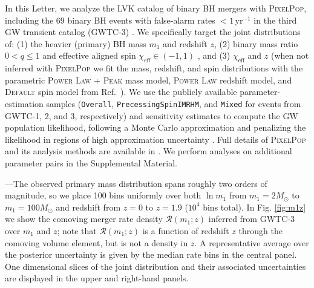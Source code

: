 \begin{refsection}
In this Letter, we analyze the LVK catalog of binary BH mergers with \textsc{PixelPop}, including the 69 binary BH events with false-alarm rates $<1\,\mathrm{yr}^{-1}$ in the third GW transient catalog (GWTC-3) \cite{LIGOScientific:2021djp, KAGRA:2021duu}. We specifically target the joint distributions of: (1) the heavier (primary) BH mass $m_1$ and redshift $z$, (2) binary mass ratio $0<q\leq1$ and effective aligned spin $\chi_\mathrm{eff}\in(-1,1)$ \cite{Racine:2008qv}, and (3) $\chi_\mathrm{eff}$ and $z$ (when not inferred with \textsc{PixelPop} we fit the mass, redshift, and spin distributions with the parametric \textsc{Power Law + Peak} mass model, \textsc{Power Law} redshift model, and \textsc{Default} spin model from Ref.~\cite{KAGRA:2021duu}). We use the publicly available \cite{LIGOScientific:2019lzm, KAGRA:2023pio} parameter-estimation samples \cite{gwtc1_pe, gwtc2_pe, ligo_scientific_collaboration_and_virgo_2022_6513631, ligo_scientific_collaboration_and_virgo_2023_8177023} (\texttt{Overall}, \texttt{PrecessingSpinIMRHM}, and \texttt{Mixed} for events from GWTC-1, 2, and 3, respectively) and sensitivity estimates \cite{ligo_scientific_collaboration_and_virgo_2023_7890398} to compute the GW population likelihood, following a Monte Carlo approximation \cite{Thrane:2018qnx, Vitale2020, KAGRA:2021duu} and penalizing the likelihood in regions of high approximation uncertainty \cite{Farr:2019rap, Essick:2022ojx, Talbot:2023pex}. Full details of \textsc{PixelPop} and its analysis methods are available in \citeauthor{Heinzel:2024jlc} \cite{Heinzel:2024jlc}. We perform analyses on additional parameter pairs in the Supplemental Material.

---The observed primary mass distribution spans roughly two orders of magnitude, so we place 100 bins uniformly over both $\ln m_1$ from $m_1=2M_\odot$ to $m_1=100M_\odot$ and redshift from $z=0$ to $z=1.9$ ($10^4$ bins total). In Fig. \ref{fig:m1z} we show the comoving merger rate density $\mathcal{R}(m_1;z)$ inferred from GWTC-3 over $m_1$ and $z$; note that $\mathcal{R}(m_1;z)$ is a function of redshift $z$ through the comoving volume element, but is not a density in $z$. A representative average over the posterior uncertainty is given by the median rate bins in the central panel. One dimensional slices of the joint distribution and their associated uncertainties are displayed in the upper and right-hand panels.


\end{refsection}
